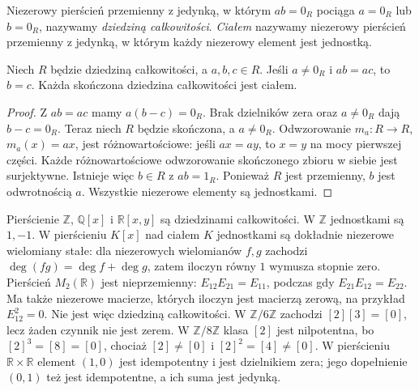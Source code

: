 \begin{definicja}
\label{aa:def:dziedzina-cialo}
Niezerowy pierścień przemienny z jedynką, w którym
$ab=0_R$ pociąga $a=0_R$ lub $b=0_R$, nazywamy
\emph{dziedziną całkowitości}. \emph{Ciałem} nazywamy
niezerowy pierścień przemienny z jedynką, w którym każdy
niezerowy element jest jednostką.
\end{definicja}
\begin{lemat}
\label{aa:lem:skracanie-pierscien}
Niech $R$ będzie dziedziną całkowitości, a $a,b,c\in R$.
Jeśli $a\ne0_R$ i $ab=ac$, to $b=c$.
Każda skończona dziedzina całkowitości jest ciałem.
\end{lemat}
\begin{proof}
Z $ab=ac$ mamy $a(b-c)=0_R$. Brak dzielników zera
oraz $a\ne0_R$ dają $b-c=0_R$. Teraz niech $R$ będzie
skończona, a $a\ne0_R$. Odwzorowanie $m_a:R\to R$,
$m_a(x)=ax$, jest różnowartościowe: jeśli $ax=ay$, to $x=y$
na mocy pierwszej części. Każde różnowartościowe odwzorowanie
skończonego zbioru w siebie jest surjektywne. Istnieje więc
$b\in R$ z $ab=1_R$. Ponieważ $R$ jest przemienny,
$b$ jest odwrotnością $a$. Wszystkie niezerowe elementy są jednostkami.
\end{proof}

\begin{przyklad}
\label{aa:prz:pierscien-struktury}
Pierścienie $\mathbb Z$, $\mathbb Q[x]$ i $\mathbb R[x,y]$
są dziedzinami całkowitości. W $\mathbb Z$ jednostkami są
$1,-1$. W pierścieniu $K[x]$ nad ciałem $K$ jednostkami
są dokładnie niezerowe wielomiany stałe: dla niezerowych
wielomianów $f,g$ zachodzi $\deg(fg)=\deg f+\deg g$,
zatem iloczyn równy $1$ wymusza stopnie zero.
Pierścień $M_2(\mathbb R)$ jest nieprzemienny:
$E_{12}E_{21}=E_{11}$, podczas gdy $E_{21}E_{12}=E_{22}$.
Ma także niezerowe macierze, których iloczyn jest macierzą zerową,
na przykład $E_{12}^2=0$. Nie jest więc dziedziną całkowitości.
W $\mathbb Z/6\mathbb Z$ zachodzi $[2][3]=[0]$, lecz
żaden czynnik nie jest zerem. W $\mathbb Z/8\mathbb Z$
klasa $[2]$ jest nilpotentna, bo $[2]^3=[8]=[0]$,
chociaż $[2]\ne[0]$ i $[2]^2=[4]\ne[0]$.
W pierścieniu $\mathbb R\times\mathbb R$ element $(1,0)$
jest idempotentny i jest dzielnikiem zera; jego dopełnienie
$(0,1)$ też jest idempotentne, a ich suma jest jedynką.
\end{przyklad}

